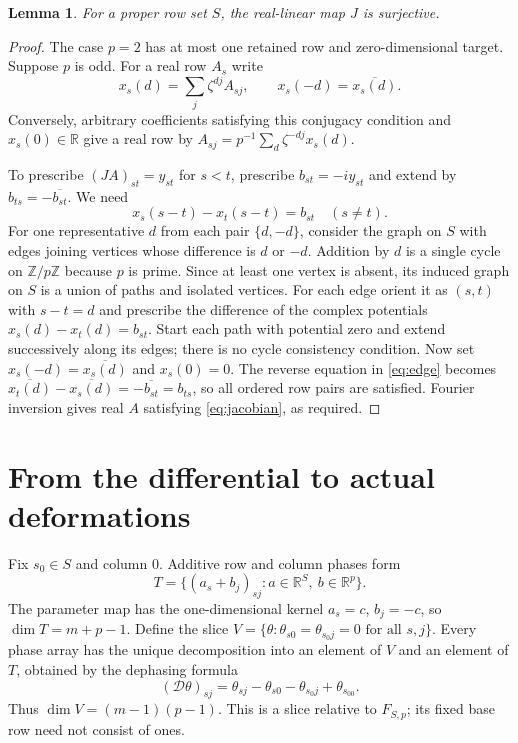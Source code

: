 \documentclass[11pt]{article}
\newtheorem{lemma}[theorem]{Lemma}
\newcommand{\R}{\mathbb R}
\newcommand{\Z}{\mathbb Z}
\begin{document}
\begin{lemma}\label{lem:surjectivity}
For a proper row set $S$, the real-linear map $J$ is surjective.
\end{lemma}
\begin{proof}
The case $p=2$ has at most one retained row and zero-dimensional target.
Suppose $p$ is odd. For a real row $A_s$ write
\[
x_s(d)=\sum_j\zeta^{dj}A_{sj},\qquad
x_s(-d)=\overline{x_s(d)}.
\]
Conversely, arbitrary coefficients satisfying this conjugacy condition
and $x_s(0)\in\R$ give a real row by
$A_{sj}=p^{-1}\sum_d\zeta^{-dj}x_s(d)$.

To prescribe $(JA)_{st}=y_{st}$ for $s<t$, prescribe
$b_{st}=-iy_{st}$ and extend by
$b_{ts}=-\overline{b_{st}}$. We need
\begin{equation}\label{eq:edge}
x_s(s-t)-x_t(s-t)=b_{st}\quad(s\ne t).
\end{equation}
For one representative $d$ from each pair $\{d,-d\}$, consider the graph
on $S$ with edges joining vertices whose difference is $d$ or $-d$.
Addition by $d$ is a single cycle on $\Z/p\Z$ because $p$ is prime.
Since at least one vertex is absent, its induced graph on $S$ is a union
of paths and isolated vertices. For each edge orient it as $(s,t)$ with
$s-t=d$ and prescribe the difference of the complex potentials
$x_s(d)-x_t(d)=b_{st}$. Start each path with potential zero and extend
successively along its edges; there is no cycle consistency condition.
Now set $x_s(-d)=\overline{x_s(d)}$ and $x_s(0)=0$. The reverse equation
in \eqref{eq:edge} becomes
$\overline{x_t(d)}-\overline{x_s(d)}=-\overline{b_{st}}=b_{ts}$,
so all ordered row pairs are satisfied. Fourier inversion gives real
$A$ satisfying \eqref{eq:jacobian}, as required.
\end{proof}

\section{From the differential to actual deformations}
Fix $s_0\in S$ and column $0$. Additive row and column phases form
\[
T=\{(a_s+b_j)_{sj}:a\in\R^S,\ b\in\R^p\}.
\]
The parameter map has the one-dimensional kernel
$a_s=c$, $b_j=-c$, so $\dim T=m+p-1$.
Define the slice
$V=\{\theta:\theta_{s0}=\theta_{s_0j}=0\text{ for all }s,j\}$.
Every phase array has the unique decomposition into an element of $V$
and an element of $T$, obtained by the dephasing formula
\begin{equation}\label{eq:slice}
(\mathcal D\theta)_{sj}
=\theta_{sj}-\theta_{s0}-\theta_{s_0j}+\theta_{s_00}.
\end{equation}
Thus $\dim V=(m-1)(p-1)$. This is a slice relative to $F_{S,p}$;
its fixed base row need not consist of ones.
\end{document}
